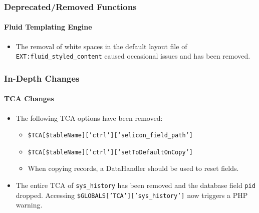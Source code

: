 
\begin{frame}[fragile]
	\frametitle{Deprecated/Removed Functions}
	\framesubtitle{Fluid Templating Engine}

	\begin{itemize}
		\item The removal of white spaces in the default layout file of \texttt{EXT:fluid\_styled\_content}
			caused occasional issues and has been removed.

	\end{itemize}

\end{frame}


\begin{frame}[fragile]
	\frametitle{In-Depth Changes}
	\framesubtitle{TCA Changes}

	\begin{itemize}
		\item The following TCA options have been removed:

			\begin{itemize}
				\item \texttt{\$TCA[\$tableName]['ctrl']['selicon\_field\_path']}
				\item \texttt{\$TCA[\$tableName]['ctrl']['setToDefaultOnCopy']}
			\end{itemize}

			\begin{itemize}\smaller
				\item[\ding{228}] When copying records, a DataHandler should be used to reset fields.
			\end{itemize}\normalsize

		\item The entire TCA of \texttt{sys\_history} has been removed and the database field \texttt{pid} dropped.
			Accessing \texttt{\$GLOBALS['TCA']['sys\_history']} now triggers a PHP warning.

	\end{itemize}

\end{frame}


